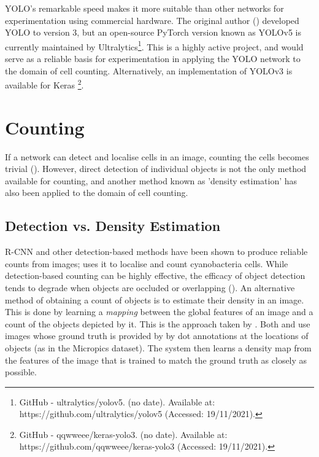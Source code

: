 YOLO's remarkable speed makes it more suitable than other networks for experimentation using commercial hardware. The original author (\cite{redmon2016look}) developed YOLO to version 3, but an open-source PyTorch version known as YOLOv5 is currently maintained by Ultralytics\footnote{GitHub - ultralytics/yolov5. (no date). Available at: https://github.com/ultralytics/yolov5 (Accessed: 19/11/2021).}. This is a highly active project, and would serve as a reliable basis for experimentation in applying the YOLO network to the domain of cell counting. Alternatively, an implementation of YOLOv3 is available for Keras \footnote{GitHub - qqwweee/keras-yolo3. (no date). Available at: https://github.com/qqwweee/keras-yolo3 (Accessed: 19/11/2021).}.


\section{Counting} \label{density-estimation}
If a network can detect and localise cells in an image, counting the cells becomes trivial (\cite{Zisserman}). However, direct detection of individual objects is not the only method available for counting, and another method known as 'density estimation' has also been applied to the domain of cell counting.

\subsection{Detection vs. Density Estimation}
R-CNN and other detection-based methods have been shown to produce reliable counts from images; \cite{Identification-and-enumeration-of-cyanobacteria} uses it to localise and count cyanobacteria cells. While detection-based counting can be highly effective, the efficacy of object detection tends to degrade when objects are occluded or overlapping (\cite{Zisserman}). An alternative method of obtaining a count of objects is to estimate their density in an image. This is done by learning a \textit{mapping} between the global features of an image and a count of the objects depicted by it. This is the approach taken by \cite{xie2018microscopy}. Both \cite{Zisserman}  and \cite{xie2018microscopy} use images whose ground truth is provided by by dot annotations at the locations of objects (as in the Micropics dataset). The system then learns a density map from the features of the image that is trained to match the ground truth as closely as possible.\\

